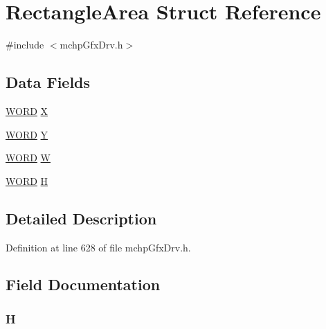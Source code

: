 \hypertarget{struct_rectangle_area}{}\section{Rectangle\+Area Struct Reference}
\label{struct_rectangle_area}


{\ttfamily \#include $<$mchp\+Gfx\+Drv.\+h$>$}

\subsection*{Data Fields}
\begin{DoxyCompactItemize}
\item 
\hyperlink{_generic_type_defs_8h_a2b0e863dadf920709ec53d9088ee7c91}{W\+O\+R\+D} \hyperlink{struct_rectangle_area_a7b0996e32ac615aee22f3b895d45f5c8}{X}
\item 
\hyperlink{_generic_type_defs_8h_a2b0e863dadf920709ec53d9088ee7c91}{W\+O\+R\+D} \hyperlink{struct_rectangle_area_ad83f3cd64de290d13d00032f988ac2c4}{Y}
\item 
\hyperlink{_generic_type_defs_8h_a2b0e863dadf920709ec53d9088ee7c91}{W\+O\+R\+D} \hyperlink{struct_rectangle_area_a24c45f6de6f03ce6e2e53d0d40d40fb7}{W}
\item 
\hyperlink{_generic_type_defs_8h_a2b0e863dadf920709ec53d9088ee7c91}{W\+O\+R\+D} \hyperlink{struct_rectangle_area_a880c4d4054af4cfd62e3402465fe55ef}{H}
\end{DoxyCompactItemize}


\subsection{Detailed Description}


Definition at line 628 of file mchp\+Gfx\+Drv.\+h.



\subsection{Field Documentation}
\hypertarget{struct_rectangle_area_a880c4d4054af4cfd62e3402465fe55ef}{}
\subsubsection[{H}]{ H}\label{struct_rectangle_area_a880c4d4054af4cfd62e3402465fe55ef}


